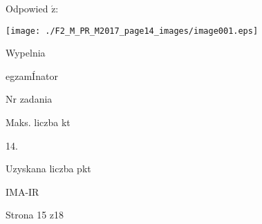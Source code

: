 \documentclass[a4paper,12pt]{article}
\begin{document}
Odpowied $\acute{\mathrm{z}}$:
\begin{center}
\texttt{[image: ./F2\_M\_PR\_M2017\_page14\_images/image001.eps]}
\end{center}
Wypelnia

egzamÍnator

Nr zadania

Maks. liczba kt

14.

Uzyskana liczba pkt

IMA-IR

Strona 15 z18
\end{document}
